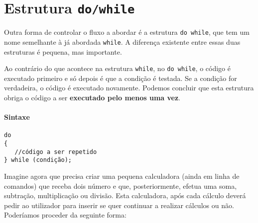 \section{Estrutura \texttt{do/while}}

Outra forma de controlar o fluxo a abordar é a estrutura \texttt{do while}, que tem um nome semelhante à já abordada \texttt{while}. A diferença existente entre essas duas estruturas é pequena, mas importante.

Ao contrário do que acontece na estrutura \texttt{while}, no \texttt{do while}, o código é executado primeiro e só depois é que a condição é testada. Se a condição for verdadeira, o código é executado novamente. Podemos concluir que esta estrutura obriga o código a ser \textbf{executado pelo menos uma vez}.

\paragraph{Sintaxe}

\begin{lstlisting}
do
{
   //código a ser repetido
} while (condição);
\end{lstlisting}

Imagine agora que precisa criar uma pequena calculadora (ainda em linha de comandos) que receba dois número e que, posteriormente, efetua uma soma, subtração, multiplicação ou divisão. Esta calculadora, após cada cálculo deverá pedir ao utilizador para inserir se quer continuar a realizar cálculos ou não. Poderíamos proceder da seguinte forma:

